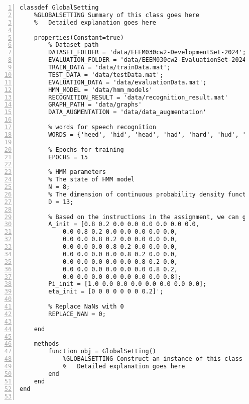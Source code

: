 \documentclass{article}
\begin{document}
\begin{lstlisting}[frame=single, numbers=left, style=Matlab-editor, caption={GlobalSetting.m}, label={lst:GlobalSetting}]
  classdef GlobalSetting
    %GLOBALSETTING Summary of this class goes here
    %   Detailed explanation goes here

    properties(Constant=true)
        % Dataset path
        DATASET_FOLDER = 'data/EEEM030cw2-DevelopmentSet-2024';
        EVALUATION_FOLDER = 'data/EEEM030cw2-EvaluationSet-2024';
        TRAIN_DATA = 'data/trainData.mat';
        TEST_DATA = 'data/testData.mat';
        EVALUATION_DATA = 'data/evaluationData.mat';
        HMM_MODEL = 'data/hmm_models'
        RECOGNITION_RESULT = 'data/recognition_result.mat'
        GRAPH_PATH = 'data/graphs'
        DATA_AUGMENTATION = 'data/data_augmentation'

        % words for speech recognition
        WORDS = {'heed', 'hid', 'head', 'had', 'hard', 'hud', 'hod', 'hoard', 'hood', 'whod', 'heard'}

        % Epochs for training
        EPOCHS = 15

        % HMM parameters
        % The state of HMM model
        N = 8;
        % The dimension of continuous probability density function
        D = 13;

        % Based on the instructions in the assignment, we can get initial A and Pi in Table 1
        A_init = [0.8 0.2 0.0 0.0 0.0 0.0 0.0 0.0,
            0.0 0.8 0.2 0.0 0.0 0.0 0.0 0.0,
            0.0 0.0 0.8 0.2 0.0 0.0 0.0 0.0,
            0.0 0.0 0.0 0.8 0.2 0.0 0.0 0.0,
            0.0 0.0 0.0 0.0 0.8 0.2 0.0 0.0,
            0.0 0.0 0.0 0.0 0.0 0.8 0.2 0.0,
            0.0 0.0 0.0 0.0 0.0 0.0 0.8 0.2,
            0.0 0.0 0.0 0.0 0.0 0.0 0.0 0.8];
        Pi_init = [1.0 0.0 0.0 0.0 0.0 0.0 0.0 0.0];
        eta_init = [0 0 0 0 0 0 0 0.2]';

        % Replace NaNs with 0
        REPLACE_NAN = 0;

    end

    methods
        function obj = GlobalSetting()
            %GLOBALSETTING Construct an instance of this class
            %   Detailed explanation goes here
        end
    end
end


\end{lstlisting}
\end{document}
